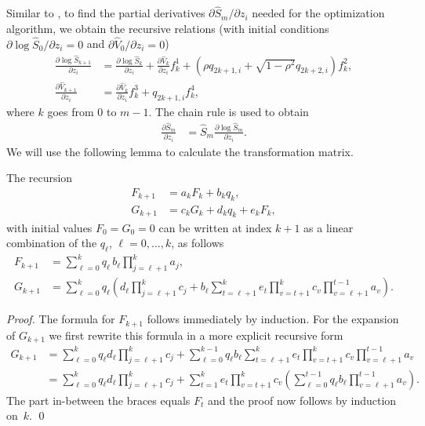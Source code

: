 \documentclass[graybox,footinfo]{svmult}
\begin{document}
Similar to \cite{IT2006},
to find the partial derivatives $\partial \hat{S}_m/\partial z_i$ needed for the optimization algorithm, we obtain the recursive relations (with initial conditions $\partial \log \hat{S}_0 /\partial z_i=0$ and $\partial \hat{V}_0/\partial z_i=0$)
\begin{align}
  \frac{\partial \log\hat{S}_{k+1}}{\partial z_i}
  &=
  \frac{\partial\log\hat{S}_{k}}{\partial z_i} + \frac{\partial\hat{V}_k}{\partial z_i}f^1_{k} + \left(\rho q_{2k+1,i}+\sqrt{1-\rho^2}q_{2k+2,i}\right
) f^2_{k}
  , \label{eq:recLT1} \\
  \frac{\partial \hat{V}_{k+1}}{\partial z_i}
 &=
 \frac{\partial \hat{V}_k}{\partial z_i} f^3_k + q_{2k+1,i} f^4_k
  \label{eq:recLT2}
  ,
\end{align}
where $k$ goes from $0$ to $m-1$.
The chain rule is used to obtain
\begin{align*}
 \frac{\partial \hat{S}_m}{\partial z_i}
 &=
 \hat{S}_m \frac{\partial \log \hat{S}_m}{\partial z_i}
 .
\end{align*}
We will use the following lemma to calculate the transformation matrix.
\begin{lemma}\label{lem:RecAid}
  The recursion
  \begin{align*}
    F_{k+1} &= a_k F_k + b_k q_k ,
    \\
    G_{k+1} &= c_k G_k + d_k q_k + e_k F_k,
  \end{align*}
  with initial values $F_0 = G_0 = 0$ can be written at index $k+1$ as a linear combination of the $q_{\ell}$, $\ell=0,\ldots,k$, as follows
  \begin{align*}
    F_{k+1} &= \sum_{\ell=0}^k q_{\ell} \, b_{\ell} \prod_{j=\ell+1}^k a_j ,
    \\
    G_{k+1} &= \sum_{\ell=0}^k q_{\ell}
      \left(
        d_{\ell} \prod_{j=\ell+1}^k c_j
        +
        b_{\ell} \sum_{t=\ell+1}^k e_t \prod_{v=t+1}^k c_v \prod_{v=\ell+1}^{t-1} a_v\right)
    .
  \end{align*}
\end{lemma}
\begin{proof}
  The formula for $F_{k+1}$ follows immediately by induction.
  For the expansion of $G_{k+1}$ we first rewrite this formula in a more explicit recursive form
  \begin{align*}
    G_{k+1}
    &=
    \sum_{\ell=0}^{k} q_{\ell} d_{\ell} \prod_{j=\ell+1}^k c_j
    +
    \sum_{\ell=0}^{k-1} q_{\ell} b_{\ell} \sum_{t=\ell+1}^k e_t \prod_{v=t+1}^k c_v  \prod_{v=\ell+1}^{t-1} a_v
    \\
    &=
    \sum_{\ell=0}^{k} q_{\ell} d_{\ell} \prod_{j=\ell+1}^k c_j
    +
    \sum_{t=1}^k e_t \prod_{v=t+1}^k c_v \left( \sum_{\ell=0}^{t-1} q_{\ell} b_{\ell} \prod_{v=\ell+1}^{t-1} a_v \right)
    .
  \end{align*}
  The part in-between the braces equals $F_t$ and the proof now follows by induction on~$k$.
  \qed
\end{proof}
\end{document}
